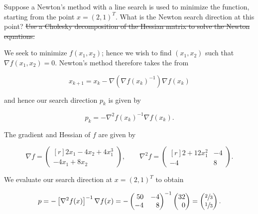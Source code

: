Suppose a Newton's method with a line search is used to minimize the function, starting from the point $x = (2, 1)^T$.
What is the Newton search direction at this point? \sout{Use a Cholesky decomposition of the Hessian matrix to solve the
Newton equations.}

\begin{solution}
    We seek to minimize $f(x_1, x_2)$; hence we wish to find $(x_1, x_2)$ such that $\nabla f(x_1, x_2) = 0$. Newton's 
    method therefore takes the from
    
    $$
    x_{k+1} = x_{k} - \nabla \left( \nabla f(x_k)^{-1} \right) \nabla f(x_k)
    $$

    and hence our search direction $p_k$ is given by

    $$
    p_k = - \nabla^2 f(x_k)^{-1} \nabla f(x_k).
    $$

    The gradient and Hessian of $f$ are given by

    $$
    \nabla f = \begin{pmatrix*}[r]
         2 x_1 - 4 x_2 + 4 x_1^3 \\
        -4 x_1 + 8 x_2 
    \end{pmatrix*}, \qquad \nabla^2 f = \begin{pmatrix*}[r]
         2 + 12 x_1^2 & -4 \\
        -4            &  8
    \end{pmatrix*}.
    $$

    We evaluate our search direction at $x = (2, 1)^T$ to obtain

    $$
    p = - \left[ \nabla^2 f(x) \right]^{-1} \nabla f(x) = - \begin{pmatrix*}[r]
        50 & -4 \\
        -4 &  8
    \end{pmatrix*}^{-1} \begin{pmatrix*}[r]
        32 \\
        0
    \end{pmatrix*} = \begin{pmatrix*}[r]
        \sfrac{2}{3} \\
        \sfrac{1}{3}
    \end{pmatrix*}.
    $$
    \ \\
\end{solution}
